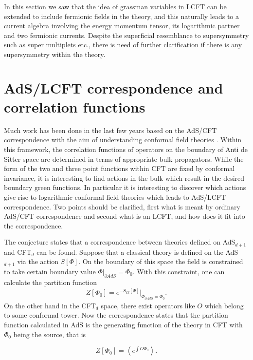 \documentclass[a4paper,11pt]{article}
\begin{document}
In this section we saw that the idea of grassman variables in
LCFT can be extended to include fermionic fields in the theory,
and this naturally leads to a current algebra involving the energy
momentum tensor, its logarithmic partner and two fermionic
currents. Despite the superficial resemblance to supersymmetry
such as super multiplets etc., there is need of further
clarification if there is any supersymmetry within the theory.
\section{AdS/LCFT correspondence and correlation functions}
Much work has been done in the last few years based on the AdS/CFT
correspondence with the aim of understanding conformal field
theories \cite{aha}. Within this framework, the correlation
functions of operators on the boundary of Anti de Sitter space
are determined in terms of appropriate bulk propagators. While
the form of the two and three point functions within CFT are
fixed by conformal invariance, it is interesting to find actions
in the bulk which result in the desired boundary green functions.
In particular it is interesting to discover which actions give
rise to logarithmic conformal field theories which leads to
AdS/LCFT correspondence. Two points should be clarified, first
what is meant by ordinary AdS/CFT correspondence and second what
is an LCFT, and how does it fit into the correspondence.

The conjecture states that a correspondence between theories
defined on AdS$_{d+1}$ and CFT$_{d}$ can be found. Suppose that a
classical theory is defined on the AdS$_{d+1}$ via the action
$S[\Phi]$. On the boundary of this space the field is constrained
to take certain boundary value ${\Phi|}_{\partial AdS} =\Phi_0$.
With this constraint, one can calculate the partition function
\begin{eqnarray}\label{eq:a112}
Z[\Phi_0]={e^{-S_{Cl}[\Phi]}}|_{\Phi_{\partial AdS}=\Phi_0}.
\end{eqnarray}
On the other hand in the CFT$_{d}$ space, there exist operators
like $O$ which belong to some conformal tower. Now the
correspondence states that the partition function calculated in
AdS is the generating function of the theory in CFT with $\Phi_0$
being the source, that is

\begin{equation}\label{eq:a113}
Z[\Phi_0]=\left\langle e^{\int O\Phi_0} \right\rangle.
\end{equation}
\end{document}
